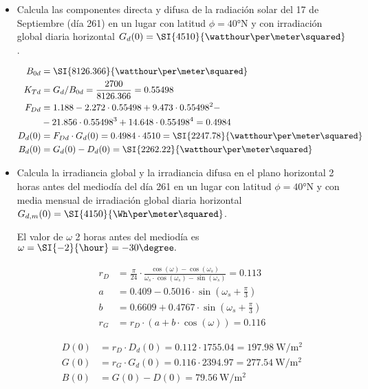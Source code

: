 \begin{itemize}
\item Calcula las componentes directa y difusa de la radiación solar
  del 17 de Septiembre (día 261) en un lugar con latitud
  $\phi=\ang{40}\mathrm{N}$ y con irradiación global diaria horizontal
  $G_d(0)=\SI{4510}{\watthour\per\meter\squared}$.

\begin{align*}
  B_{0d} &= \SI{8126.366}{\watthour\per\meter\squared}\\
  K_{Td} &= G_{d}/B_{0d} = \frac{2700}{8126.366} = 0.55498\\
  F_{Dd} &= 1.188 - 2.272 \cdot 0.55498 + 9.473 \cdot 0.55498^{2} -\\
         &- 21.856 \cdot 0.55498^{3} + 14.648 \cdot 0.55498^{4} = 0.4984\\
  D_d(0) &= F_{Dd} \cdot G_d(0) = 0.4984 \cdot 4510 = \SI{2247.78}{\watthour\per\meter\squared}\\
  B_d(0) &= G_d(0) - D_d(0) = \SI{2262.22}{\watthour\per\meter\squared}
\end{align*}


\item Calcula la irradiancia global y la irradiancia difusa en el
  plano horizontal 2 horas antes del mediodía del día 261 en un lugar
  con latitud $\phi=\ang{40}\mathrm{N}$ y con media mensual de
  irradiación global diaria horizontal
  $G_{d,m}(0)=\SI{4150}{\Wh\per\meter\squared}$.

  El valor de $\omega$ 2 horas antes del mediodía es
  $\omega = \SI{-2}{\hour} = -30\degree.$

\begin{align*}
  r_{D} &= \frac{\pi}{24}\cdot\frac{\cos(\omega)-\cos(\omega_{s})}{\omega_{s}\cdot\cos(\omega_{s})-\sin(\omega_{s})} = 0.113\\
  a &= 0.409-0.5016\cdot\sin(\omega_{s}+\frac{\pi}{3})\\
  b &= 0.6609+0.4767\cdot\sin(\omega_{s}+\frac{\pi}{3})\\
  r_{G} &= r_{D}\cdot\left(a + b\cdot\cos(\omega)\right) = 0.116
\end{align*}

\begin{align*}
  D(0) &= r_D \cdot D_{d}(0) = 0.112 \cdot 1755.04 = \SI{197.98}{\watt\per\meter\squared}\\
  G(0) &= r_G \cdot G_{d}(0) = 0.116 \cdot 2394.97 = \SI{277.54}{\watt\per\meter\squared}\\
  B(0) &= G(0) - D(0) = \SI{79.56}{\watt\per\meter\squared}
\end{align*}
\end{itemize}
